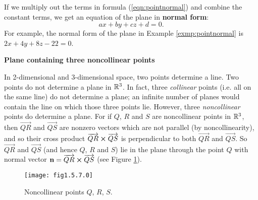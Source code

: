 If we multiply out the terms in formula (\ref{eqn:pointnormal}) and combine the constant terms, we get an
equation of the plane in \textbf{normal form}:
\begin{equation}
 ax + by + cz + d = 0.
\end{equation}
For example, the normal form of the plane in Example \ref{exmp:pointnormal} is $2x + 4y + 8z - 22 = 0$.
\pagebreak[3]
\par\noindent\textbf{\large{Plane containing three noncollinear points}}\normalsize\vspace{1.5mm}

In 2-dimensional and 3-dimensional space, two points determine a line. Two points do not determine a plane in
$\mathbb{R}^{3}$. 
In fact, three \emph{collinear} points (i.e. all on the same line)
do not determine a plane; an infinite number of planes would contain the line on which those three points lie.
However, three \emph{noncollinear} points do determine a plane. For if $Q$, $R$ and $S$ are noncollinear points in
$\mathbb{R}^{3}$, then $\overrightarrow{QR}$ and $\overrightarrow{QS}$ are  nonzero vectors which are not parallel (by
noncollinearity), and so their cross product $\overrightarrow{QR} \bm{\times} \overrightarrow{QS}$ is perpendicular to
both $\overrightarrow{QR}$ and $\overrightarrow{QS}$. So $\overrightarrow{QR}$ and
$\overrightarrow{QS}$ (and hence $Q$, $R$ and $S$) lie in the plane through the point $Q$ with normal vector
$\textbf{n} = \overrightarrow{QR} \bm{\times} \overrightarrow{QS}$ (see Figure \ref{fig:plane3pts}).

\begin{figure}[h]
 \begin{center}
  \texttt{[image: fig1.5.7.0]}
 \end{center}\vspace{-5mm}
 \caption[]{\quad Noncollinear points $Q$, $R$, $S$.}
 \label{fig:plane3pts}
\end{figure}

